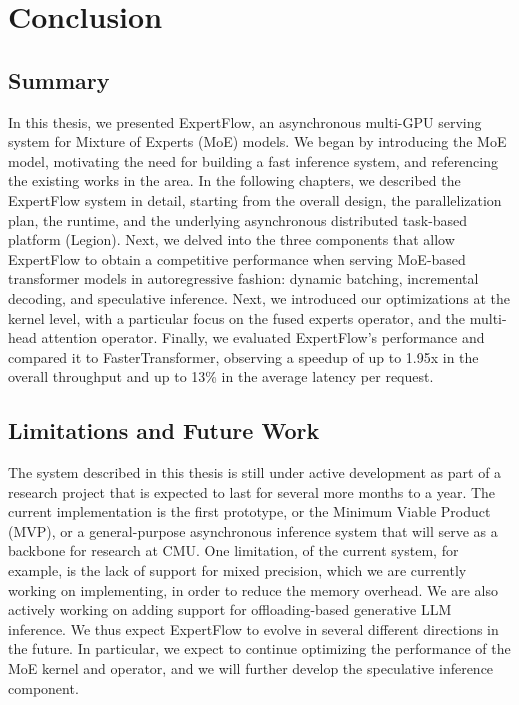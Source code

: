 
\chapter{Conclusion}\label{chapter-8}

\section{Summary}
In this thesis, we presented ExpertFlow, an asynchronous multi-GPU serving system for Mixture of Experts (MoE) models. We began by introducing the MoE model, motivating the need for building a fast inference system, and referencing the existing works in the area. In the following chapters, we described the ExpertFlow system in detail, starting from the overall design, the parallelization plan, the runtime, and the underlying asynchronous distributed task-based platform (Legion). Next, we delved into the three components that allow ExpertFlow to obtain a competitive performance when serving MoE-based transformer models in autoregressive fashion: dynamic batching, incremental decoding, and speculative inference. Next, we introduced our optimizations at the kernel level, with a particular focus on the fused experts operator, and the multi-head attention operator. Finally, we evaluated ExpertFlow's performance and compared it to FasterTransformer, observing a speedup of up to 1.95x in the overall throughput and up to 13\% in the average latency per request.

\section{Limitations and Future Work}
The system described in this thesis is still under active development as part of a research project that is expected to last for several more months to a year. The current implementation is the first prototype, or the Minimum Viable Product (MVP), or a general-purpose asynchronous inference system that will serve as a backbone for research at CMU. One limitation, of the current system, for example, is the lack of support for mixed precision, which we are currently working on implementing, in order to reduce the memory overhead. We are also actively working on adding support for offloading-based generative LLM inference. We thus expect ExpertFlow to evolve in several different directions in the future. In particular, we expect to continue optimizing the performance of the MoE kernel and operator, and we will further develop the speculative inference component.
